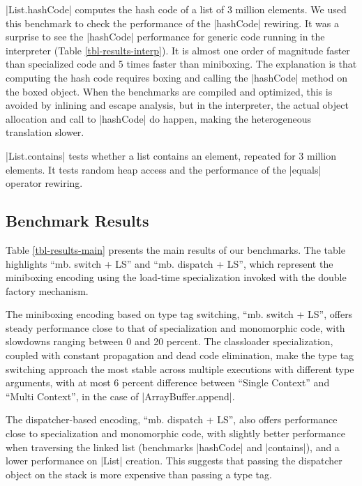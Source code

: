 |List.hashCode| computes the hash code of a list of 3 million elements. We used this benchmark to check the performance of the |hashCode| rewiring. It was a surprise to see the |hashCode| performance for generic code running in the interpreter (Table \ref{tbl-results-interp}). It is almost one order of magnitude faster than specialized code and 5 times faster than miniboxing. The explanation is that computing the hash code requires boxing and calling the |hashCode| method on the boxed object. When the benchmarks are compiled and optimized, this is avoided by inlining and escape analysis, but in the interpreter, the actual object allocation and call to |hashCode| do happen, making the heterogeneous translation slower.
 
|List.contains| tests whether a list contains an element, repeated for 3 million elements. It tests random heap access and the performance of the |equals| operator rewiring.

\subsection{Benchmark Results}
\label{subsec-eval-results}

Table \ref{tbl-results-main} presents the main results of our benchmarks. The table highlights  ``mb. switch + LS'' and ``mb. dispatch + LS'', which represent the miniboxing encoding using the load-time specialization invoked with the double factory mechanism.

The miniboxing encoding based on type tag switching, ``mb. switch + LS'', offers steady performance close to that of specialization and monomorphic code, with slowdowns ranging between 0 and 20 percent. The classloader specialization, coupled with constant propagation and dead code elimination, make the type tag switching approach the most stable across multiple executions with different type arguments, with at most 6 percent difference between ``Single Context'' and ``Multi Context'', in the case of |ArrayBuffer.append|.    

The dispatcher-based encoding, ``mb. dispatch + LS'', also offers performance close to specialization and mono\-morphic code, with slightly better performance when traversing the linked list (benchmarks |hashCode| and |contains|), and a lower performance on |List| creation. This suggests that passing the dispatcher object on the stack is more expensive than passing a type tag. 

